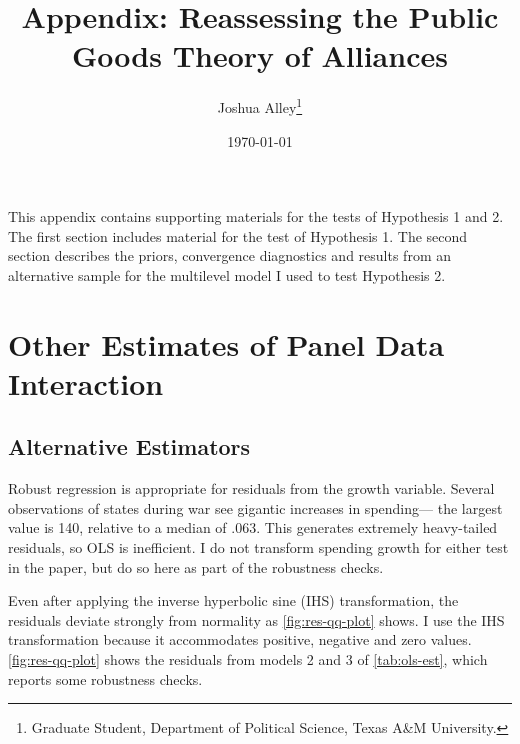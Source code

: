 \documentclass[12pt]{article}
\title{
\textbf{Appendix: Reassessing the Public Goods Theory of Alliances}
	}
\author{Joshua Alley\footnote{Graduate Student,
Department of Political Science, Texas A\&M University.}}
\date{{\normalsize \today}}
\begin{document}
\maketitle 

\doublespace

This appendix contains supporting materials for the tests of Hypothesis 1 and 2. 
The first section includes material for the test of Hypothesis 1. 
The second section describes the priors, convergence diagnostics and results from an alternative sample for the multilevel model I used to test Hypothesis 2. 

\section{Other Estimates of Panel Data Interaction}


\subsection{Alternative Estimators}


Robust regression is appropriate for residuals from the growth variable. 
Several observations of states during war see gigantic increases in spending--- the largest value is 140, relative to a median of .063. 
This generates extremely heavy-tailed residuals, so OLS is inefficient. 
I do not transform spending growth for either test in the paper, but do so here as part of the robustness checks. 


Even after applying the inverse hyperbolic sine (IHS) transformation, the residuals deviate strongly from normality as \autoref{fig:res-qq-plot} shows. 
I use the IHS transformation because it accommodates positive, negative and zero values. 
\autoref{fig:res-qq-plot} shows the residuals from models 2 and 3 of \autoref{tab:ols-est}, which reports some robustness checks.
\end{document}
